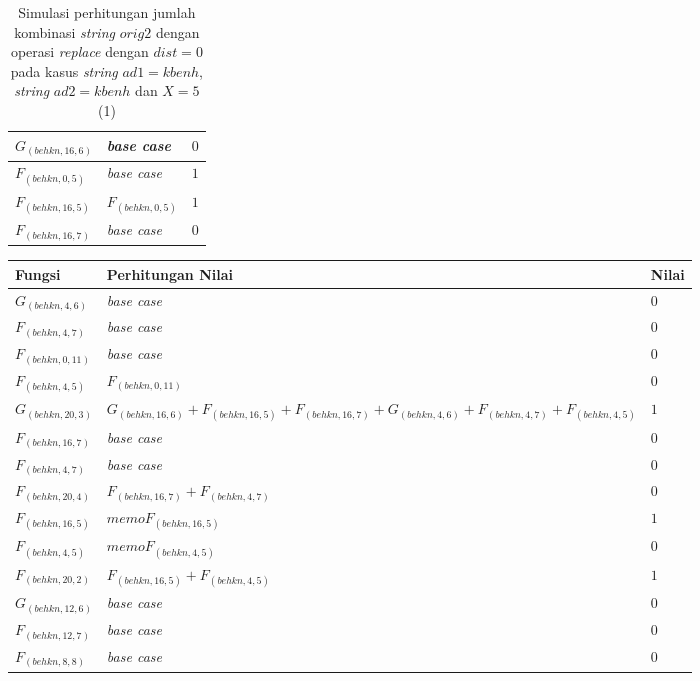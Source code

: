 \begin{appendices}
\begin{table}[H]
\begin{tabular} {|p{3cm}|p{5cm}|p{1cm}|}
  		$ G_{(behkn, 16, 6)} $ & \textit{base case} & $ 0 $ \\ \hline
  		$ F_{(behkn, 0, 5)} $ & \textit{base case} & $ 1 $ \\ \hline
  		$ F_{(behkn, 16, 5)}  $ & $F_{(behkn, 0, 5)}$ & $ 1 $ \\ \hline
  		$ F_{(behkn, 16, 7)} $ & \textit{base case} & $ 0 $ \\ \hline
  	\end{tabular}\caption{Simulasi perhitungan jumlah kombinasi \textit{string} $ orig2 $ dengan operasi \textit{replace} dengan $ dist= 0  $ pada kasus \textit{string} $ ad1=kbenh $, \textit{string} $ ad2=kbenh $ dan $ X=5 $ (1)}
  	\label{tab:g_3_orig2_0_1}
  \end{table}
  \begin{table}[H]
  	\centering
  	\begin{tabular} {|p{3cm}|p{5cm}|p{1cm}|} \hline
  		Fungsi & Perhitungan Nilai & Nilai \\ \hline		
  		$ G_{(behkn, 4, 6)} $ & \textit{base case} & $ 0 $ \\ \hline
  		$ F_{(behkn, 4, 7)} $ & \textit{base case} & $ 0 $ \\ \hline
  		$ F_{(behkn, 0, 11)} $ & \textit{base case} & $ 0 $ \\ \hline
  		$ F_{(behkn, 4, 5)}  $ & $F_{(behkn, 0, 11)}$ & $ 0 $ \\ \hline
  		$ G_{(behkn, 20, 3)}  $ & $G_{(behkn, 16, 6)} + F_{(behkn, 16, 5)} + F_{(behkn, 16, 7)} + G_{(behkn, 4, 6)} + F_{(behkn, 4, 7)} + F_{(behkn, 4, 5)}$ & $ 1 $ \\ \hline
  		$ F_{(behkn, 16, 7)} $ & \textit{base case} & $ 0 $ \\ \hline
  		$ F_{(behkn, 4, 7)} $ & \textit{base case} & $ 0 $ \\ \hline
  		$ F_{(behkn, 20, 4)}  $ & $F_{(behkn, 16, 7)} + F_{(behkn, 4, 7)}$ & $ 0 $ \\ \hline
  		$ F_{(behkn, 16, 5)}  $ & $memoF_{(behkn, 16, 5)}$ & $ 1 $ \\ \hline
  		$ F_{(behkn, 4, 5)}  $ & $memoF_{(behkn, 4, 5)}$ & $ 0 $ \\ \hline
  		$ F_{(behkn, 20, 2)}  $ & $F_{(behkn, 16, 5)} + F_{(behkn, 4, 5)}$ & $ 1 $ \\ \hline
  		$ G_{(behkn, 12, 6)} $ & \textit{base case} & $ 0 $ \\ \hline
  		$ F_{(behkn, 12, 7)} $ & \textit{base case} & $ 0 $ \\ \hline
  		$ F_{(behkn, 8, 8)} $ & \textit{base case} & $ 0 $ \\ \hline

\end{tabular}
\end{table}
\end{appendices}
